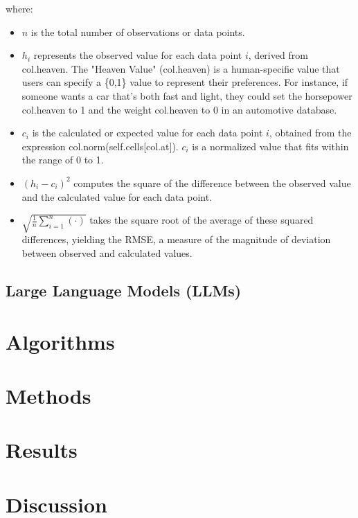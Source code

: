 \documentclass{ieeeaccess}
\begin{document}
where:
\begin{itemize}
    \item $n$ is the total number of observations or data points.
    \item $h_i$ represents the observed value for each data point $i$, derived from col.heaven. The "Heaven Value" (col.heaven) is a human-specific value that users can specify a \{0,1\} value to represent their preferences. For instance, if someone wants a car that's both fast and light, they could set the horsepower col.heaven to 1 and the weight col.heaven to 0 in an automotive database.
    \item $c_i$ is the calculated or expected value for each data point $i$, obtained from the expression col.norm(self.cells[col.at]). $c_i$ is a normalized value that fits within the range of 0 to 1.
    \item $(h_i - c_i)^2$ computes the square of the difference between the observed value and the calculated value for each data point.
    \item $\sqrt{\frac{1}{n} \sum_{i=1}^n (\cdot)}$ takes the square root of the average of these squared differences, yielding the RMSE, a measure of the magnitude of deviation between observed and calculated values.
\end{itemize}




\subsection{Large Language Models (LLMs)}


\section{Algorithms}
\label{sec:algorithms}

\section{Methods}
\label{sec:methods}


\section{Results}
\label{sec:results}

\section{Discussion}
\label{sec:discussion}
\end{document}

